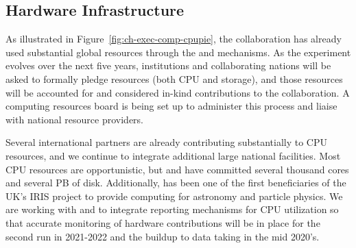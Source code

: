 \subsection{Hardware Infrastructure}
As illustrated in Figure~\ref{fig:ch-exec-comp-cpupie}, the  collaboration has already used substantial global resources through the  and  mechanisms. As the experiment evolves over the next five years, institutions and collaborating nations will be asked to formally pledge resources (both CPU and storage), and those resources will be accounted for and considered in-kind contributions to the collaboration.  A   computing resources board  is being set up to administer this process and liaise with national resource providers. 

Several international partners are already contributing substantially to CPU resources, and we continue to  integrate additional large national facilities. Most CPU resources are opportunistic, but  and  have committed several thousand cores and several PB of disk. Additionally,   has been one of the first beneficiaries of the UK's IRIS project to provide computing for astronomy and particle physics.  
We are working with  and  to integrate reporting mechanisms for CPU utilization so that accurate monitoring of hardware contributions will be in place for the second  run in 2021-2022 and the buildup to data taking in the mid 2020's. 


